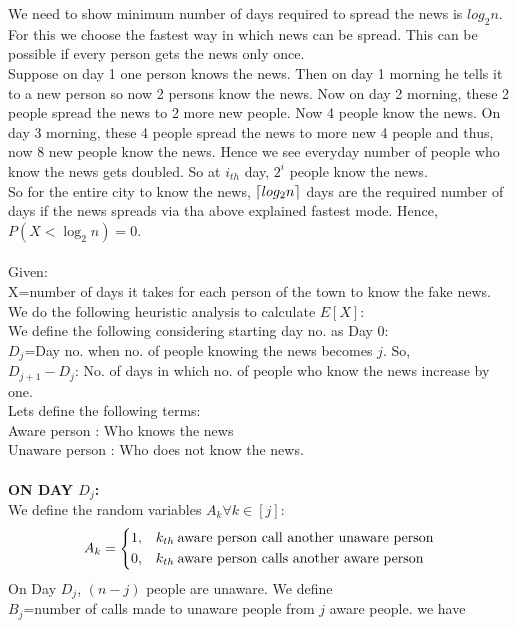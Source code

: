 \documentclass[12pt]{article}
\begin{document}
  \begin{solution}
    We need to show minimum number of days required to spread the news is $log_2n$. For this we choose the fastest way in which news can be spread. This can be possible if every person gets the news only once.\\
    Suppose on day 1 one person knows the news. Then on day 1 morning he tells it to a new person so now 2 persons know the news. Now on day 2 morning, these 2 people spread the news to 2 more new people. Now 4 people know the news. On day 3 morning, these 4 people spread the news to more new 4 people and thus, now 8 new people know the news. Hence we see everyday number of people who know the news gets doubled. So at $i_{th}$ day, $2^i$ people know the news. \\
    So for the entire city to know the news, $\lceil log_2 n \rceil$ days are the required number of days if the news spreads via tha above explained fastest mode.
    Hence, $P(X < \log_2 n) = 0$.
    \\\\
    Given:\\
    X=number of days it takes for each
    person of the town to know the fake news.\\
    We do the following heuristic analysis to calculate $E[X]$:
\\    We define the following considering starting day no. as Day 0:\\
    $D_j$=Day no. when no. of people knowing the news becomes $j$.
    So,\\
    $D_{j+1}-D_j$: No. of days in which no. of people who know the news increase by one.\\
    Lets define the following terms:\\
    Aware person : Who knows the news\\
    Unaware person : Who does not know the news.\\\\
    \textbf{ON DAY $D_j$:}\\
    We define the random variables $A_k \forall k\in[j]:$
    \[
    A_k=
    \begin{dcases}
        1, & k_{th} \:\text{aware person call another  unaware person} \\
        0, & k_{th} \:\text{aware person calls another aware person}
    \end{dcases}
    \]
    On Day $D_j$, $(n-j)$ people are unaware. We define\\
    $B_j$=number of calls made to unaware people from $j$ aware people. we have\\

\end{solution}
\end{document}
